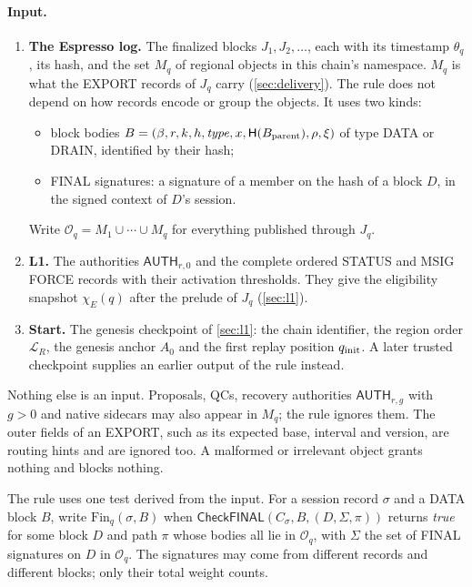 \documentclass[11pt,a4paper]{article}
\newcommand{\Hash}{\mathsf H}
\newcommand{\tagg}[1]{\ensuremath{\mathsf{#1}}}
\begin{document}
\paragraph{Input.}
\label{sec:logical-carrier}
\begin{enumerate}[label=(I\arabic*),itemsep=2pt]
\item \textbf{The Espresso log.} The finalized blocks $J_1,J_2,\ldots$,
each with its timestamp $\theta_q$, its hash, and the set $M_q$ of
regional objects in this chain's namespace. $M_q$ is what the EXPORT
records of $J_q$ carry (\cref{sec:delivery}). The rule does not depend on
how records encode or group the objects. It uses two kinds:
 \begin{itemize}[itemsep=1pt]
 \item block bodies
 $B=(\beta,r,k,h,\mathit{type},x,\Hash(B_{\rm parent}),\rho,\xi)$ of type
 DATA or DRAIN, identified by their hash;
 \item FINAL signatures: a signature of a member on the hash of a block
 $D$, in the signed context of $D$'s session.
 \end{itemize}
Write $\mathcal O_q=M_1\cup\cdots\cup M_q$ for everything published
through $J_q$.
\item \textbf{L1.} The authorities $\tagg{AUTH}_{r,0}$ and the complete
ordered STATUS and MSIG FORCE records with their activation thresholds.
They give the eligibility snapshot $\chi_E(q)$ after the prelude of $J_q$
(\cref{sec:l1}).
\item \textbf{Start.} The genesis checkpoint of \cref{sec:l1}: the chain
identifier, the region order $\mathcal L_R$, the genesis anchor $A_0$ and
the first replay position $q_{\rm init}$. A later trusted checkpoint
supplies an earlier output of the rule instead.
\end{enumerate}
Nothing else is an input. Proposals, QCs, recovery authorities
$\tagg{AUTH}_{r,g}$ with $g>0$ and native sidecars may also appear in
$M_q$; the rule ignores them. The outer fields of an EXPORT, such as its
expected base, interval and version, are routing hints and are ignored
too. A malformed or irrelevant object grants nothing and blocks nothing.

The rule uses one test derived from the input. For a session record
$\sigma$ and a DATA block $B$, write $\mathrm{Fin}_q(\sigma,B)$ when
$\tagg{CheckFINAL}(C_\sigma,B,(D,\Sigma,\pi))$ returns \emph{true} for
some block $D$ and path $\pi$ whose bodies all lie in $\mathcal O_q$, with
$\Sigma$ the set of FINAL signatures on $D$ in $\mathcal O_q$. The
signatures may come from different records and different blocks; only
their total weight counts.
\end{document}
